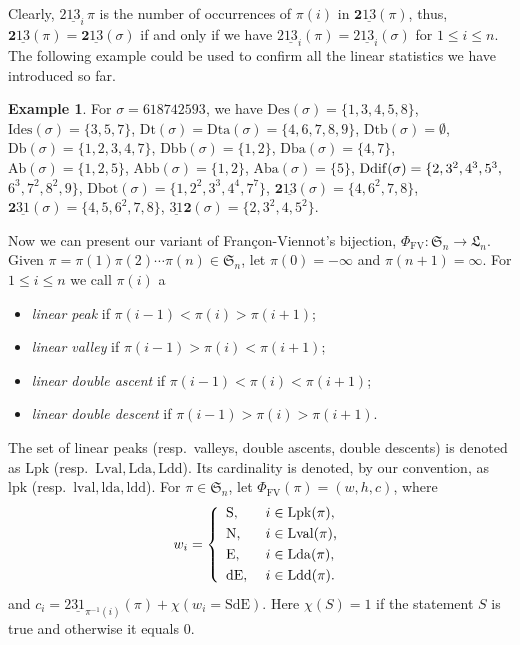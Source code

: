 \documentclass[12pt]{amsart}
\numberwithin{equation}{section}
\theoremstyle{plain}
\theoremstyle{definition}
\newtheorem{example}[theorem]{Example}
\def\FV{\mathrm{FV}}
\def\SS{\mathfrak{S}}
\def\LH{\mathfrak{L}}
\def\N{\mathrm{N}}
\def\S{\mathrm{S}}
\def\E{\mathrm{E}}
\def\dE{\mathrm{dE}}
\def\SdE{\mathrm{SdE}}
\def\Des{\mathrm{Des}}
\def\Db{\mathrm{Db}}
\def\Ab{\mathrm{Ab}}
\def\Id{\mathrm{Ides}}
\def\Dt{\mathrm{Dt}}
\def\Ddif{\mathrm{Ddif}}
\def\Dbot{\mathrm{Dbot}}
\def\Dtb{\mathrm{Dtb}}
\def\Dta{\mathrm{Dta}}
\def\Dbb{\mathrm{Dbb}}
\def\Dba{\mathrm{Dba}}
\def\Abb{\mathrm{Abb}}
\def\Aba{\mathrm{Aba}}
\def\Lpk{\mathrm{Lpk}}
\def\Lval{\mathrm{Lval}}
\def\Lda{\mathrm{Lda}}
\def\Ldd{\mathrm{Ldd}}
\def\lpk{\mathrm{lpk}}
\def\lval{\mathrm{lval}}
\def\lda{\mathrm{lda}}
\def\ldd{\mathrm{ldd}}
\def\pprs{\mathrm{2\underline{13}}}
\def\ppwrs{\mathrm{2\underline{31}}}
\def\rightascent{{\mathbf{2}\underline{13}}}
\def\leftdescent{\mathrm{\underline{31}}\mathbf{2}}
\def\rightdescent{\mathrm{\mathbf{2}\underline{31}}}
\begin{document}
Clearly, $\pprs_i\, \pi$ is the number of occurrences of $\pi(i)$ in $\rightascent(\pi)$, thus, $\rightascent(\pi) =\rightascent(\sigma)$ if and only if we have
$\pprs_i(\pi)=\pprs_i(\sigma)$ for $1 \leq i \leq n$. The following example could be used to confirm all the linear statistics we have introduced so far.



\begin{example}
For $\sigma=618742593$, we have
$\Des(\sigma)=\{1,3,4,5,8\}$,
$\Id(\sigma)=\{3,5,7\}$,
$\Dt(\sigma)=\Dta(\sigma)=\{4,6,7,8,9\}$,
$\Dtb(\sigma)=\emptyset$,
$\Db(\sigma)=\{1,2,3,4,7\}$,
$\Dbb(\sigma)=\{1,2\}$,
$\Dba(\sigma)=\{4,7\}$,
$\Ab(\sigma)=\{1,2,5\}$,
$\Abb(\sigma)=\{1,2\}$,
$\Aba(\sigma)=\{5\}$,
$\Ddif(\sigma)=\{2,3^2,4^3,5^3,\linebreak$
$6^3,7^2,8^2,9\}$,
$\Dbot(\sigma)=\{1,2^2,3^3,4^4,7^7\}$,
$\rightascent(\sigma)=\{4,6^2,7,8\}$,
$\rightdescent(\sigma)=\{4,5,6^2,7,8\}$,
$\leftdescent(\sigma)=\{2,3^2,4,5^2\}$.
\end{example}

Now we can present our variant of Fran\c con-Viennot's bijection, $\Phi_{\FV}: \SS_n \to \LH_n$.
Given $\pi=\pi(1)\pi(2) \cdots \pi(n) \in \SS_n$, let $\pi(0)=-\infty$ and
$\pi(n+1)=\infty$. For $1 \leq i \leq n$ we call $\pi(i)$ a
\begin{itemize}
  \item {\em linear peak} if $\pi(i-1) < \pi(i) >\pi(i+1)$;
  \item {\em linear valley} if $\pi(i-1) > \pi(i) < \pi(i+1)$;
  \item {\em linear double ascent} if $\pi(i-1) < \pi(i) <\pi(i+1)$;
  \item {\em linear double descent} if $\pi(i-1) > \pi(i) >\pi(i+1)$.
\end{itemize}
The set of linear peaks (resp.~valleys, double ascents, double descents) is denoted as $\Lpk$ (resp.~$\Lval, \Lda, \Ldd$). Its cardinality is denoted, by our convention, as $\lpk$ (resp.~$\lval, \lda, \ldd$). For $\pi \in \SS_n$, let $\Phi_{\FV}(\pi)=(w,h,c)$, where
\begin{equation*}
w_i= \left\{
  \begin{array}{ll}
  \S, & \mbox{  $ i \in \Lpk(\pi)$,} \\[3pt]
  \N, & \mbox{ $ i \in \Lval(\pi)$,}\\[3pt]
  \E, & \mbox{  $ i \in \Lda(\pi)$,}\\[3pt]
  \dE, & \mbox{  $ i \in \Ldd(\pi)$.}
 \end{array} \right.
\end{equation*}
and $c_{i}=\ppwrs_{\pi^{-1}(i)}(\pi)+\chi(w_{i}=\SdE)$. Here $\chi(S)=1$ if the statement $S$ is true and otherwise it equals $0$.
\end{document}
